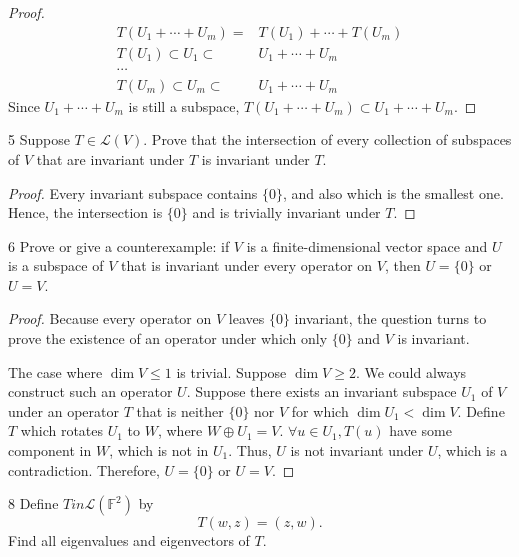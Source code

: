\documentclass{extarticle}
\newenvironment{problem}[1]{\begin{prob*}{#1}{}}{\end{prob*}}
\begin{document}
\begin{proof}
\begin{align*}
T(U_1 + \cdots+ U_m) =& T(U_1) + \cdots + T(U_m) \\
T(U_1) \subset U_1 \subset& U_1 + \cdots + U_m\\
\cdots \\
T(U_m) \subset U_m \subset& U_1 + \cdots + U_m
\end{align*}
Since $U_1 + \cdots + U_m$ is still a subspace, $T(U_1 + \cdots + U_m) \subset U_1 + \cdots + U_m$.
\end{proof}

\newpage

\begin{problem}{5}
Suppose $T \in \mathcal{L}(V)$. Prove that the intersection of every collection of subspaces of $V$ that are invariant under $T$ is invariant under $T$.
\end{problem}

\begin{proof}
Every invariant subspace contains $\{0\}$, and also which is the smallest one. Hence, the intersection is $\{0\}$ and is trivially invariant under $T$.
\end{proof}

\begin{problem}{6}
Prove or give a counterexample: if $V$ is a finite-dimensional vector space and $U$ is a subspace of $V$ that is invariant under every operator on $V$, then $U = \{0\}$ or $U = V$.
\end{problem}

\begin{proof}
  Because every operator on $V$ leaves $\{0\}$ invariant, the question turns to prove the existence of an operator under which only $\{0\}$ and $V$ is invariant.

  The case where $\operatorname{dim} V \le 1$ is trivial.
  Suppose $\operatorname{dim} V \ge 2$. We could always construct such an operator $U$. Suppose there exists an invariant subspace $U_1$ of $V$ under an operator $T$ that is neither $\{0\}$ nor $V$ for which $\operatorname{dim} U_1 < \operatorname{dim} V$. Define $T$ which rotates $U_1$ to $W$, where $W \oplus U_1 = V$. $\forall u \in U_1, T(u)$ have some component in $W$, which is not in $U_1$. Thus, $U$ is not invariant under $U$, which is a contradiction. Therefore, $U = \{0\}$ or $U = V$.
\end{proof}

\begin{problem}{8}
Define $T in \mathcal{L}(\mathbb{F}^2)$ by \[
  T(w,z) = (z,w).\]
Find all eigenvalues and eigenvectors of $T$.
\end{problem}

\end{document}
